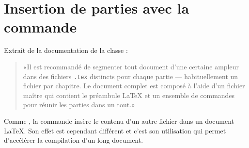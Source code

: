 \section{Insertion de parties avec la commande }
\label{sec:include:include}

Extrait de la documentation de la classe :
\begin{quote}
  «Il est recommandé de segmenter tout document d'une certaine ampleur
  dans des fichiers \verb=.tex= distincts pour chaque partie ---
  habituellement un fichier par chapitre. Le document complet est
  composé à l'aide d'un fichier maître qui contient le préambule
  {\LaTeX} et un ensemble de commandes \verb== pour réunir les
  parties dans un tout.»
\end{quote}

Comme \verb==, la commande \verb== insère le contenu
d'un autre fichier dans un document {\LaTeX}. Son effet est cependant
différent et c'est son utilisation qui permet d'accélérer la
compilation d'un long document.


